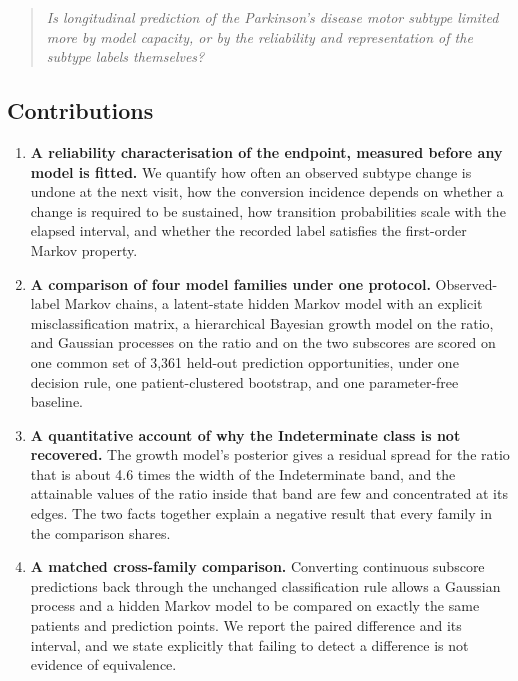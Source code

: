 \documentclass[11pt]{article}
\begin{document}
\begin{quote}
\emph{Is longitudinal prediction of the Parkinson's disease motor subtype
limited more by model capacity, or by the reliability and representation of the
subtype labels themselves?}
\end{quote}

\subsection*{Contributions}

\begin{enumerate}
\itemsep2pt
\item \textbf{A reliability characterisation of the endpoint, measured before
any model is fitted.} We quantify how often an observed subtype change is undone
at the next visit, how the conversion incidence depends on whether a change is
required to be sustained, how transition probabilities scale with the elapsed
interval, and whether the recorded label satisfies the first-order Markov
property.

\item \textbf{A comparison of four model families under one protocol.}
Observed-label Markov chains, a latent-state hidden Markov model with an
explicit misclassification matrix, a hierarchical Bayesian growth model on the
ratio, and Gaussian processes on the ratio and on the two subscores are scored
on one common set of 3,361 held-out prediction opportunities, under one decision
rule, one patient-clustered bootstrap, and one parameter-free baseline.

\item \textbf{A quantitative account of why the Indeterminate class is not
recovered.} The growth model's posterior gives a residual spread for the ratio
that is about 4.6 times the width of the Indeterminate band, and the attainable
values of the ratio inside that band are few and concentrated at its edges. The
two facts together explain a negative result that every family in the comparison
shares.

\item \textbf{A matched cross-family comparison.} Converting continuous subscore
predictions back through the unchanged classification rule allows a Gaussian
process and a hidden Markov model to be compared on exactly the same patients
and prediction points. We report the paired difference and its interval, and we
state explicitly that failing to detect a difference is not evidence of
equivalence.
\end{enumerate}
\end{document}
